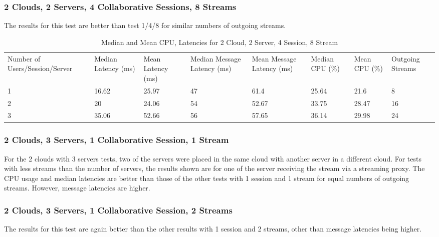 \clearpage\subsubsection{2 Clouds, 2 Servers, 4 Collaborative Sessions, 8 Streams}

The results for this test are better than test 1/4/8 for similar numbers of outgoing streams.

\begin{table}
\caption{Median and Mean CPU, Latencies for 2 Cloud, 2 Server, 4 Session, 8 Stream}
\label{table:2cld_2serv_4sess_8str}
\begin{tabu} to\linewidth{|X[c]|X[c]|X[c]|X[c]|X[c]|X[c]|X[c]|X[c]|}
\everyrow{\hline}
\hline
Number of Users/Session/Server & Median Latency (ms) & Mean Latency (ms) & Median Message Latency (ms) & Mean Message Latency (ms) & Median CPU (\%) & Mean CPU (\%) & Outgoing Streams\\
1 & 16.62 & 25.97 & 47 & 61.4 & 25.64 & 21.6 & 8 \\
2 & 20 & 24.06 & 54 & 52.67 & 33.75 & 28.47 & 16 \\
3 & 35.06 & 52.66 & 56 & 57.65 & 36.14 & 29.98 & 24 \\
\end{tabu}
\end{table}

\clearpage\subsubsection{2 Clouds, 3 Servers, 1 Collaborative Session, 1 Stream}

For the 2 clouds with 3 servers tests, two of the servers were placed in the same cloud with another server in a different cloud. For tests with less streams than the number of servers, the results shown are for one of the server receiving the stream via a streaming proxy. The CPU usage and median latencies are better than those of the other tests with 1 session and 1 stream for equal numbers of outgoing streams. However, message latencies are higher.

\subsubsection{2 Clouds, 3 Servers, 1 Collaborative Session, 2 Streams}

The results for this test are again better than the other results with 1 session and 2 streams, other than message latencies being higher.

